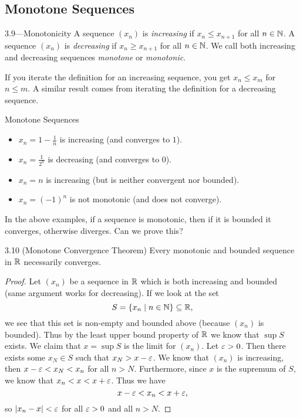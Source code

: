 \documentclass[class=article, crop=false]{standalone}
\begin{document}
  \subsection{Monotone Sequences}
  \begin{definition}{3.9---Monotonicity}
    A sequence $(x_n)$ is \emph{increasing} if $x_n\leq x_{n + 1}$ for all $n\in \mathbb{N}$. A sequence $(x_n)$ is \emph{decreasing} if $x_n\geq x_{n + 1}$ for all $n\in \mathbb{N}$. We call both increasing and decreasing sequences \emph{monotone} or \emph{monotonic}.
  \end{definition}
  \begin{note}{}
    If you iterate the definition for an increasing sequence, you get $x_n\leq x_m$ for $n\leq m$. A similar result comes from iterating the definition for a decreasing sequence.
  \end{note}
  \begin{example}{Monotone Sequences}
    \begin{itemize}
      \item $x_n = 1-\frac{1}{n}$ is increasing (and converges to $1$).
      \item $x_n = \frac{1}{2^n}$ is decreasing (and converges to $0$).
      \item $x_n = n$ is increasing (but is neither convergent nor bounded).
      \item $x_n = (-1)^n$ is not monotonic (and does not converge).
    \end{itemize}
  \end{example}
  \begin{note}{}
    In the above examples, if a sequence is monotonic, then if it is bounded it converges, otherwise diverges. Can we prove this?
  \end{note}
  \begin{theorem}{3.10 (Monotone Convergence Theorem)}
    Every monotonic and bounded sequence in $\mathbb{R}$ necessarily converges.
    \begin{proof}
      Let $(x_n)$ be a sequence in $\mathbb{R}$ which is both increasing and bounded (same argument works for decreasing). If we look at the set
      \[
        S = \left\{x_n\mid n\in\mathbb{N}\right\}\subseteq \mathbb{R},
      \]
      we see that this set is non-empty and bounded above (because $(x_n)$ is bounded). Thus by the least upper bound property of $\mathbb{R}$ we know that $\sup S$ exists. We claim that $x = \sup S$ is the limit for $(x_n)$. Let $\varepsilon > 0$. Then there exists some $x_N\in S$ such that $x_N > x - \varepsilon$. We know that $(x_n)$ is increasing, then $x - \varepsilon < x_N < x_n$ for all $n > N$. Furthermore, since $x$ is the supremum of $S$, we know that $x_n < x < x + \varepsilon$. Thus we have
      \[
        x - \varepsilon < x_n < x + \varepsilon,
      \]
      so $\left\lvert x_n - x \right\rvert < \varepsilon$ for all $\varepsilon > 0$ and all $n > N$.
    \end{proof}
  \end{theorem}
\end{document}
